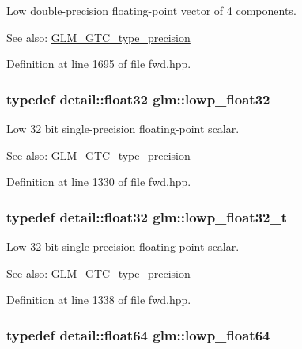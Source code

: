 Low double-precision floating-point vector of 4 components. \begin{Desc}
\item[See also:]\hyperlink{group__gtc__type__precision}{GLM\_\-GTC\_\-type\_\-precision} \end{Desc}


Definition at line 1695 of file fwd.hpp.\hypertarget{group__gtc__type__precision_g92be8087f3c84504f3a44af1a9efc51e}{
\subsubsection[lowp\_\-float32]{\setlength{\rightskip}{0pt plus 5cm}typedef detail::float32 {\bf glm::lowp\_\-float32}}}
\label{group__gtc__type__precision_g92be8087f3c84504f3a44af1a9efc51e}


Low 32 bit single-precision floating-point scalar. \begin{Desc}
\item[See also:]\hyperlink{group__gtc__type__precision}{GLM\_\-GTC\_\-type\_\-precision} \end{Desc}


Definition at line 1330 of file fwd.hpp.\hypertarget{group__gtc__type__precision_gdfb453b23cb820e3e4e766e047c67dab}{
\subsubsection[lowp\_\-float32\_\-t]{\setlength{\rightskip}{0pt plus 5cm}typedef detail::float32 {\bf glm::lowp\_\-float32\_\-t}}}
\label{group__gtc__type__precision_gdfb453b23cb820e3e4e766e047c67dab}


Low 32 bit single-precision floating-point scalar. \begin{Desc}
\item[See also:]\hyperlink{group__gtc__type__precision}{GLM\_\-GTC\_\-type\_\-precision} \end{Desc}


Definition at line 1338 of file fwd.hpp.\hypertarget{group__gtc__type__precision_g32e02689f4e83fb269c9047418536f2c}{
\subsubsection[lowp\_\-float64]{\setlength{\rightskip}{0pt plus 5cm}typedef detail::float64 {\bf glm::lowp\_\-float64}}}
\label{group__gtc__type__precision_g32e02689f4e83fb269c9047418536f2c}



